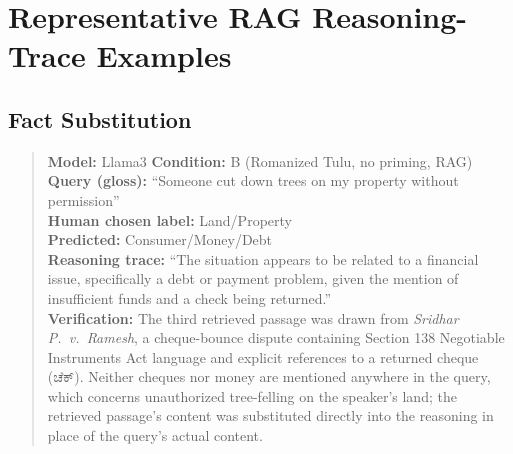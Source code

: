 \documentclass[11pt]{article}
\begin{document}
\section{Representative RAG Reasoning-Trace Examples}
\label{app:rag-examples}


\subsection{Fact Substitution}
\label{app:factsub}

\begin{quote}
\textbf{Model:} Llama3 \quad \textbf{Condition:} B (Romanized Tulu, no priming, RAG) \\
\textbf{Query (gloss):} ``Someone cut down trees on my property without permission'' \\
\textbf{Human chosen label:} Land/Property \\
\quad \textbf{Predicted:} Consumer/Money/Debt \\
\textbf{Reasoning trace:} ``The situation appears to be related to a
financial issue, specifically a debt or payment problem, given the
mention of insufficient funds and a check being returned.'' \\
\textbf{Verification:} The third retrieved passage was drawn from
\textit{Sridhar P.\ v.\ Ramesh}, a cheque-bounce dispute containing
Section 138 Negotiable Instruments Act language and explicit references
to a returned cheque ({\kannadafont ಚೆಕ್}). Neither cheques nor money are
mentioned anywhere in the query, which concerns unauthorized tree-felling
on the speaker's land; the retrieved passage's content was substituted
directly into the reasoning in place of the query's actual content.
\end{quote}
\end{document}
